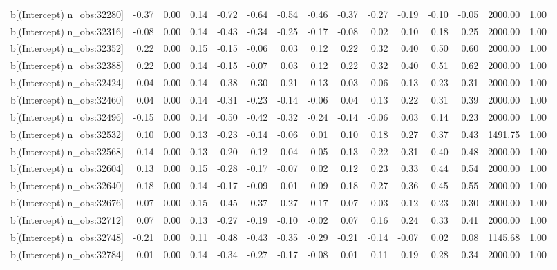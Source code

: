\begin{table}[ht]
\begin{tabular}{rrrrrrrrrrrrrrr}
  b[(Intercept) n\_obs:32280] & -0.37 & 0.00 & 0.14 & -0.72 & -0.64 & -0.54 & -0.46 & -0.37 & -0.27 & -0.19 & -0.10 & -0.05 & 2000.00 & 1.00 \\ 
  b[(Intercept) n\_obs:32316] & -0.08 & 0.00 & 0.14 & -0.43 & -0.34 & -0.25 & -0.17 & -0.08 & 0.02 & 0.10 & 0.18 & 0.25 & 2000.00 & 1.00 \\ 
  b[(Intercept) n\_obs:32352] & 0.22 & 0.00 & 0.15 & -0.15 & -0.06 & 0.03 & 0.12 & 0.22 & 0.32 & 0.40 & 0.50 & 0.60 & 2000.00 & 1.00 \\ 
  b[(Intercept) n\_obs:32388] & 0.22 & 0.00 & 0.14 & -0.15 & -0.07 & 0.03 & 0.12 & 0.22 & 0.32 & 0.40 & 0.51 & 0.62 & 2000.00 & 1.00 \\ 
  b[(Intercept) n\_obs:32424] & -0.04 & 0.00 & 0.14 & -0.38 & -0.30 & -0.21 & -0.13 & -0.03 & 0.06 & 0.13 & 0.23 & 0.31 & 2000.00 & 1.00 \\ 
  b[(Intercept) n\_obs:32460] & 0.04 & 0.00 & 0.14 & -0.31 & -0.23 & -0.14 & -0.06 & 0.04 & 0.13 & 0.22 & 0.31 & 0.39 & 2000.00 & 1.00 \\ 
  b[(Intercept) n\_obs:32496] & -0.15 & 0.00 & 0.14 & -0.50 & -0.42 & -0.32 & -0.24 & -0.14 & -0.06 & 0.03 & 0.14 & 0.23 & 2000.00 & 1.00 \\ 
  b[(Intercept) n\_obs:32532] & 0.10 & 0.00 & 0.13 & -0.23 & -0.14 & -0.06 & 0.01 & 0.10 & 0.18 & 0.27 & 0.37 & 0.43 & 1491.75 & 1.00 \\ 
  b[(Intercept) n\_obs:32568] & 0.14 & 0.00 & 0.13 & -0.20 & -0.12 & -0.04 & 0.05 & 0.13 & 0.22 & 0.31 & 0.40 & 0.48 & 2000.00 & 1.00 \\ 
  b[(Intercept) n\_obs:32604] & 0.13 & 0.00 & 0.15 & -0.28 & -0.17 & -0.07 & 0.02 & 0.12 & 0.23 & 0.33 & 0.44 & 0.54 & 2000.00 & 1.00 \\ 
  b[(Intercept) n\_obs:32640] & 0.18 & 0.00 & 0.14 & -0.17 & -0.09 & 0.01 & 0.09 & 0.18 & 0.27 & 0.36 & 0.45 & 0.55 & 2000.00 & 1.00 \\ 
  b[(Intercept) n\_obs:32676] & -0.07 & 0.00 & 0.15 & -0.45 & -0.37 & -0.27 & -0.17 & -0.07 & 0.03 & 0.12 & 0.23 & 0.30 & 2000.00 & 1.00 \\ 
  b[(Intercept) n\_obs:32712] & 0.07 & 0.00 & 0.13 & -0.27 & -0.19 & -0.10 & -0.02 & 0.07 & 0.16 & 0.24 & 0.33 & 0.41 & 2000.00 & 1.00 \\ 
  b[(Intercept) n\_obs:32748] & -0.21 & 0.00 & 0.11 & -0.48 & -0.43 & -0.35 & -0.29 & -0.21 & -0.14 & -0.07 & 0.02 & 0.08 & 1145.68 & 1.00 \\ 
  b[(Intercept) n\_obs:32784] & 0.01 & 0.00 & 0.14 & -0.34 & -0.27 & -0.17 & -0.08 & 0.01 & 0.11 & 0.19 & 0.28 & 0.34 & 2000.00 & 1.00 \\ 

\end{tabular}
\end{table}
